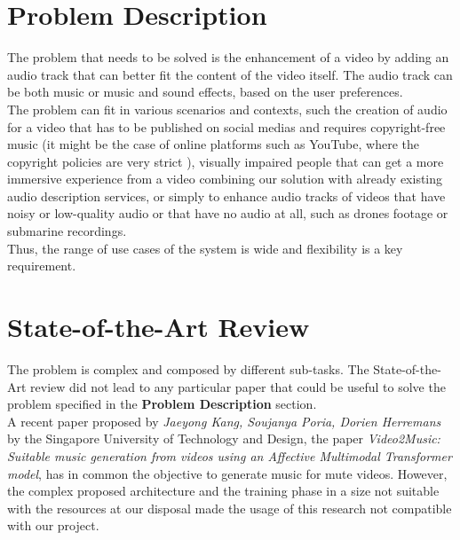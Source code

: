 \documentclass[conference]{IEEEtran}
\begin{document}
\section{Problem Description}
The problem that needs to be solved is the enhancement of a video by adding an audio track that can better fit the content of the video itself. The audio track can be both music or music and sound effects, based on the user preferences. \\
The problem can fit in various scenarios and contexts, such the creation of audio for a video that has to be published on social medias and requires copyright-free music (it might be the case of online platforms such as YouTube, where the copyright policies are very strict \cite{ytcopyright}), visually impaired people that can get a more immersive experience from a video combining our solution with already existing audio description services, or simply to enhance audio tracks of videos that have noisy or low-quality audio or that have no audio at all, such as drones footage or submarine recordings. \\
Thus, the range of use cases of the system is wide and flexibility is a key requirement. 


\section{State-of-the-Art Review}
The problem is complex and composed by different sub-tasks. The State-of-the-Art review did not lead to any particular paper that could be useful to solve the problem specified in the \textbf{Problem Description} section. \\
A recent paper proposed by \emph{Jaeyong Kang, Soujanya Poria, Dorien Herremans} by the Singapore University of Technology and Design, the paper \emph{Video2Music: Suitable music generation from videos using an Affective Multimodal Transformer model}\cite{video2music}, has in common the objective to generate music for mute videos. However, the complex proposed architecture and the training phase in a size not suitable with the resources at our disposal made the usage of this research not compatible with our project.  
\end{document}
